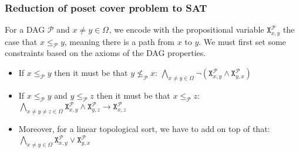 \documentclass{beamer}
\let\oldleq\leq
\renewcommand{\leq}[1][]{\oldleq_{#1}}
\renewcommand{\implies}{\rightarrow}
\newcommand{\poset}[1]{\mathcal{#1}}
\newcommand{\uni}[1][]{\Omega_{#1}}
\newcommand{\satvar}[2]{\mathtt{X}_{#1}^{#2}}
\begin{document}
\begin{frame}
\begin{figure}[H]
\begin{subfigure}[b]{0.5\textwidth}
\begin{subfigure}[b]{0.3\textwidth}
        \end{subfigure}%
        \begin{subfigure}[b]{0.3\textwidth}
            \centering
        \end{subfigure}
    \end{subfigure}
\end{figure}
\end{frame}

\begin{frame}
    \frametitle{Reduction of poset cover problem to SAT}
    For a DAG $\poset{P}$ and $x \!\neq\! y \!\in\! \uni$,
    we encode with the propositional variable
    $\satvar{x,y}{\poset{P}}$ the case that
    $x \leq[\poset{P}] y$, meaning there is a path from
    $x$ to $y$. We
    must first set some constraints based on the axioms
    of the DAG properties.
    \begin{itemize}
        \item If $x \leq[\poset{P}] y$ then it must be that
        $y \not\leq[\poset{P}] x$:
        $
        \bigwedge_{x \neq y \in \uni} \neg (\satvar{x,y}{\poset{P}} \wedge \satvar{y,x}{\poset{P}})
        $
        \item If $x \leq[\poset{P}] y$ and $y \leq[\poset{P}] z$
        then it must be that $x \leq[\poset{P}] z$:
        $
        \bigwedge_{x \neq y \neq z \in \uni}
        \satvar{x,y}{\poset{P}} \wedge \satvar{y,z}{\poset{P}} \implies \satvar{x,z}{\poset{P}}
        $
        \item Moreover, for a linear topological sort, we have to add
        on top of that:
        $
        \bigwedge_{x \neq y \in \uni} \satvar{x,y}{\poset{P}} \vee \satvar{y,x}{\poset{P}}
        $
    \end{itemize}
\end{frame}
\end{document}
